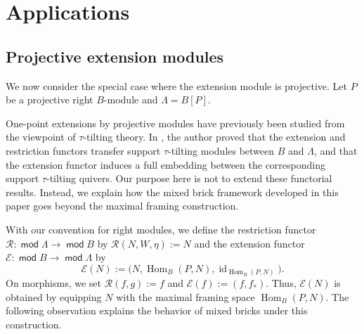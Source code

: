 \documentclass[a4,12pt]{amsart}
\numberwithin{equation}{section} %
\def\Hom{\operatorname{Hom}} %
\def\mod{\operatorname{\mathsf{mod}}}
\theoremstyle{definition} %
\begin{document}
\section{Applications}\label{Section-5}
\subsection{Projective extension modules}
We now consider the special case where the extension module is projective. Let $P$ be a projective right $B$-module and $\Lambda=B[P]$. 

One-point extensions by projective modules have previously been studied
from the viewpoint of $\tau$-tilting theory. In \cite{Suarez-projective-one-point}, the author proved that the extension and restriction functors transfer support $\tau$-tilting modules between $B$ and $\Lambda$, and that the extension functor induces a full embedding between the corresponding support $\tau$-tilting quivers. Our purpose here is not to extend these functorial results. Instead, we explain how the mixed brick framework developed in this paper goes beyond the maximal framing construction.

With our convention for right modules, we define the restriction functor $\mathcal{R}\colon\mod \Lambda\rightarrow\mod B$ by $\mathcal{R}(N,W,\eta):=N$ and the extension functor $\mathcal{E}\colon\mod B\rightarrow\mod \Lambda$ by 
\[
\mathcal{E}(N) := \bigl(
N,\Hom_B(P,N),\operatorname{id}_{\Hom_B(P,N)} \bigr). 
\]
On morphisms, we set $\mathcal{R}(f,g):=f$ and $\mathcal{E}(f):=(f,f_*)$. Thus, $\mathcal{E}(N)$ is obtained by equipping $N$ with the maximal framing space $\Hom_B(P,N)$. The following observation explains the behavior of mixed bricks under this construction.
\end{document}
